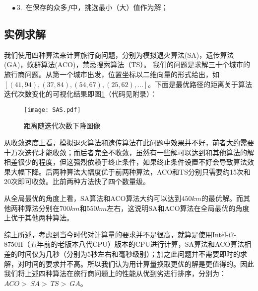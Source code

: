 $\quad \bullet$3.\ 在保存的众多$f$中，挑选最小（大）值作为解；

\subsection{实例求解}
我们使用四种算法来计算旅行商问题，分别为模拟退火算法(SA)，遗传算法(GA)，蚁群算法(ACO)，禁忌搜索算法（TS）。
我们的问题是求解三十个城市的旅行商问题。从第一个城市出发，位置坐标以二维向量的形式给出，如$[(41,94),(37,84),(54,67),(25,62),...]$。下面是最优路径的距离关于算法迭代次数变化的可视化结果即图\ref{SAS}（代码见附录）：
\begin{figure}[hbt]
    \centering
    \texttt{[image: SAS.pdf]}
	\vspace{-0.5cm}
    \caption{距离随迭代次数下降图像}
    \label{SAS}
\end{figure}

从收敛速度上看，模拟退火算法和遗传算法在此问题中效果并不好，前者大约需要十万次迭代才能收敛；而后者完全不收敛，虽然有一些解可以达到和其他算法的解相差很少的程度，但这强烈依赖于终止条件，如果终止条件设置不好会导致算法效果大幅下降。后两种算法大幅度优于前两种算法，ACO和TS分别只需要约15次和20次即可收敛。比前两种方法快了四个数量级。

从全局最优的角度上看，SA算法和ACO算法大约可以达到$450km$的最优解。而其他两种算法分别在$700km$和$550km$左右，这说明SA和ACO算法在全局最优的角度上优于其他两种算法。

综上所述，考虑到当今时代对计算量的要求并不是很高，就算是使用Intel-i7-8750H（五年前的老版本八代CPU）版本的CPU进行计算，SA算法和ACO算法相差的时间仅为几秒（分别为5秒左右和毫秒级别）；加之此问题并不需要即时的求解，对时间的要求并不高。所以我们认为用计算量换取更优的解是更值得的。因此我们将上述四种算法在旅行商问题上的性能从优到劣进行排序，分别为：$ACO>\ SA>\ TS>\ GA$。